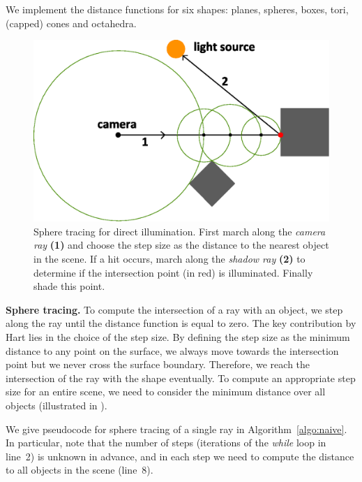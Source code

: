\documentclass[letterpaper]{article}
\newcommand{\mypar}[1]{{\bf #1.}}
\begin{document}
We implement the distance functions for six shapes: planes, spheres, boxes, tori, (capped) cones and octahedra.

\begin{figure}[t]
  \centering
  \includegraphics[width=0.9\columnwidth]{Figures/sphere_tracing_illustration.eps}
  \caption{Sphere tracing for direct illumination. First march along the \emph{camera ray} \textbf{(1)} and choose the step size as the distance to the nearest object in the scene. If a hit occurs, march along the \emph{shadow ray} \textbf{(2)} to determine if the intersection point (in red) is illuminated. Finally shade this point.\label{fig:sphere_tracing}}
\end{figure}

\mypar{Sphere tracing} To compute the intersection of a ray with an object, we step along the ray until the distance function is equal to zero. The key contribution by Hart \cite{Hart1995} lies in the choice of the step size. By defining the step size as the minimum distance to any point on the surface, we always move towards the intersection point but we never cross the surface boundary. Therefore, we reach the intersection of the ray with the shape eventually. To compute an appropriate step size for an entire scene, we need to consider the minimum distance over all objects (illustrated in ).

We give pseudocode for sphere tracing of a single ray in Algorithm~\ref{algo:naive}. In particular, note that the number of steps (iterations of the \emph{while} loop in line~2) is unknown in advance, and in each step we need to compute the distance to all objects in the scene (line~8).
\end{document}
